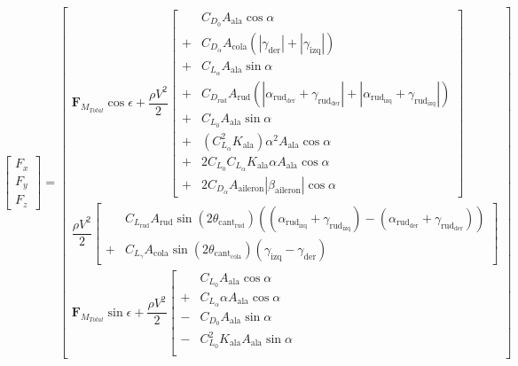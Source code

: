 \documentclass{article}
\begin{document}
\begin{equation*}
\label{eq:fuerzas_totales_corregidas}
\begin{bmatrix}
F_x \\[6pt]
F_y \\[6pt]
F_z
\end{bmatrix}
=
\begin{bmatrix}
%
\mathbf{F}_{M_{Total}} \cos\epsilon
+ \dfrac{\rho V^2}{2}
\left[
\begin{aligned}
    & C_{D_0} A_{\text{ala}} \cos\alpha \\
  + & C_{D_\alpha} A_{\text{cola}} (|\gamma_{\text{der}}| + |\gamma_{\text{izq}}|) \\
  + & C_{L_\alpha} A_{\text{ala}} \sin\alpha \\
  + & C_{D_{\text{rud}}} A_{\text{rud}} 
        (|\alpha_{\text{rud}_{\text{der}}} + \gamma_{\text{rud}_{\text{der}}}|
       + |\alpha_{\text{rud}_{\text{izq}}} + \gamma_{\text{rud}_{\text{izq}}}|) \\
  + & C_{L_0} A_{\text{ala}} \sin\alpha \\
  + & (C_{L_\alpha}^2 K_{\text{ala}}) \alpha^2 A_{\text{ala}} \cos\alpha \\
  + & 2 C_{L_0} C_{L_\alpha} K_{\text{ala}} \alpha A_{\text{ala}} \cos\alpha \\
  + & 2 C_{D_\alpha} A_{\text{aileron}} |\beta_{\text{aileron}}| \cos\alpha
\end{aligned}
\right]
\\[80pt]
%
\dfrac{\rho V^2}{2}
\left[
\begin{aligned}
    & C_{L_{\text{rud}}} A_{\text{rud}}
      \sin(2\theta_{\text{cant}_{\text{rud}}})
      \left(
        (\alpha_{\text{rud}_{\text{izq}}} + \gamma_{\text{rud}_{\text{izq}}})
        -
        (\alpha_{\text{rud}_{\text{der}}} + \gamma_{\text{rud}_{\text{der}}})
      \right) \\
  + & C_{L_\gamma} A_{\text{cola}}
      \sin(2\theta_{\text{cant}_{\text{cola}}})
      (\gamma_{\text{izq}} - \gamma_{\text{der}})
\end{aligned}
\right]
\\[40pt]
%
\mathbf{F}_{M_{Total}} \sin\epsilon
+ \dfrac{\rho V^2}{2}
\left[
\begin{aligned}
    & C_{L_0} A_{\text{ala}} \cos\alpha \\
  + & C_{L_\alpha} \alpha A_{\text{ala}} \cos\alpha \\
  - & C_{D_0} A_{\text{ala}} \sin\alpha \\
  - & C_{L_0}^2 K_{\text{ala}} A_{\text{ala}} \sin\alpha \\

\end{aligned}
\end{bmatrix}
\end{equation*}
\end{document}
